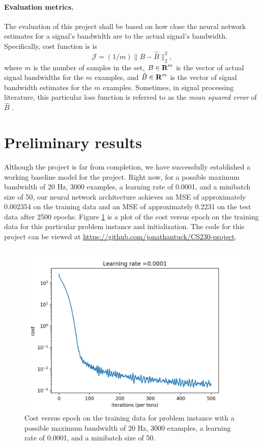 \documentclass[12pt]{article}
\begin{document}
\paragraph{Evaluation metrics.}
The evaluation of this project shall be based on how close the neural network estimates for 
a signal's bandwidth are to the actual signal's bandwidth. Specifically, cost function is
is
\[
\mathcal J = (1/m) \|B - \hat{B}\|_2^2,
\]
where $m$ is the number of samples in the set, $B \in {\mbox{\bf R}}^m$ is the vector of actual signal 
bandwidths for the $m$ examples, and $\hat B \in {\mbox{\bf R}}^m$ is the vector of signal bandwidth 
estimates for the $m$ examples. Sometimes, in signal processing literature, this particular 
loss function is referred to as the \textit{mean squared error} of $\hat{B}$ \cite{DG:10}.

\section{Preliminary results} Although the project is far from completion, we have successfully 
established a working baseline model for the project. Right now, for a possible maximum bandwidth of
20 Hz, 3000 examples, a learning rate of 0.0001, and a minibatch size of 50, our neural network 
architecture achieves an MSE of approximately 0.002354 on the training data and an MSE of approximately 
0.2231 on the test data after 2500 epochs. Figure \ref{f-example_cost_vs_epoch} is a plot of the cost
versus epoch on the training data for this particular problem instance and initialization. The code for this
project can be viewed at \url{https://github.com/jonathantuck/CS230-project}.

\begin{figure}[ht]
\centering
\includegraphics[scale=.75]{figures/cost_vs_epoch_m_3000_minibatch=50.png}
\caption{Cost versus epoch on the training data for problem instance with a possible maximum 
bandwidth of 20 Hz, 3000 examples, a learning rate of 0.0001, and a minibatch size of 50.}
\label{f-example_cost_vs_epoch}
\end{figure}
\end{document}
